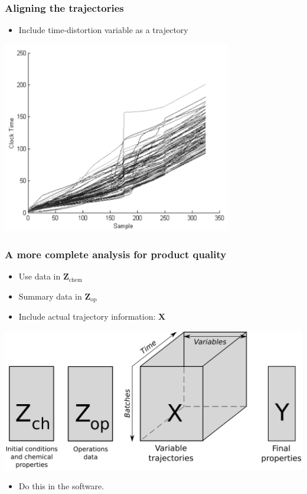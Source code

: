 \begin{frame}\frametitle{Aligning the trajectories}
	
	\begin{itemize}
		\item	Include time-distortion variable as a trajectory
	\end{itemize}
	\begin{center}
		\includegraphics[width=0.75\textwidth]{images/fmc/fmc-distorted-time.png}
	\end{center}

\end{frame}

\begin{frame}\frametitle{A more complete analysis for product quality}

\begin{itemize}
	\item	Use data in \( \mathbf{Z}_\text{chem}\)
	
	\item 	Summary data in \( \mathbf{Z}_\text{op}\)
	
	\item 	Include actual trajectory information: \( \mathbf{X}\)
\end{itemize}

\begin{center}
	\includegraphics[width=\textwidth]{images/fmc/fmc-data-structure}
\end{center}

\begin{itemize}
	\item	Do this in the software.
\end{itemize}

\end{frame}

